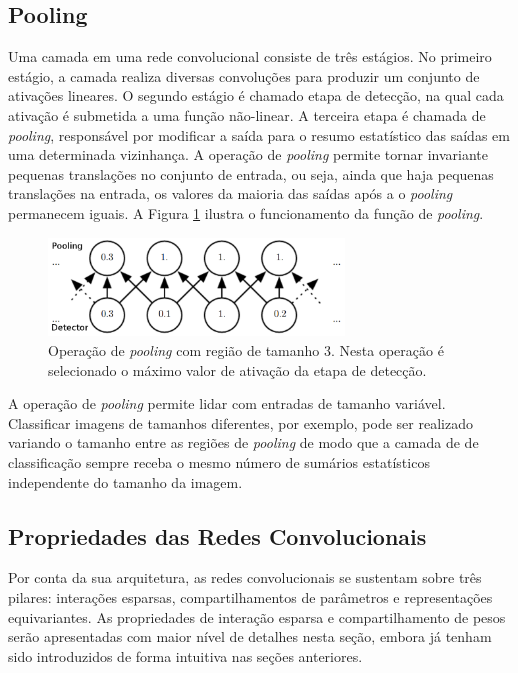 \subsection{Pooling}
Uma camada em uma rede convolucional consiste de três estágios. No primeiro estágio,
a camada realiza diversas convoluções para produzir um conjunto de ativações lineares.
O segundo estágio é chamado etapa de detecção, na qual cada ativação é submetida a uma
função não-linear. A terceira etapa é chamada de \textit{pooling}, responsável por
modificar a saída para o resumo estatístico das saídas em uma determinada vizinhança. A operação de
\textit{pooling} permite tornar invariante pequenas translações no conjunto de entrada,
ou seja, ainda que haja pequenas translações na entrada, os valores da maioria das saídas após a
o \textit{pooling} permanecem iguais. A Figura \ref{fig:pool} ilustra o funcionamento da função de \textit{pooling}.
\begin{figure}[htp]
\begin{center}
  \includegraphics[width=0.7\textwidth]{fig/pool}
  \caption{Operação de \textit{pooling} com região de tamanho 3. Nesta operação é selecionado o máximo valor de ativação da etapa de detecção.}
  \label{fig:pool}
\end{center}
\end{figure}

A operação de \textit{pooling} permite lidar com entradas de tamanho variável.
Classificar imagens de tamanhos diferentes, por exemplo, pode ser realizado
variando o tamanho entre as regiões de \textit{pooling} de modo que a camada de 
de classificação sempre receba o mesmo número de sumários estatísticos
independente do tamanho da imagem.

\subsection{Propriedades das Redes Convolucionais}
Por conta da sua arquitetura, as redes convolucionais se sustentam sobre três pilares: interações esparsas, compartilhamentos
de parâmetros e representações equivariantes. As propriedades de interação esparsa e compartilhamento de pesos serão apresentadas
com maior nível de detalhes nesta seção, embora já tenham sido introduzidos de forma intuitiva nas seções anteriores.

